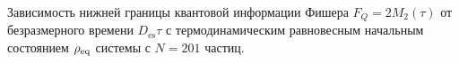  Зависимость нижней границы квантовой информации Фишера $F_Q = 2M_2(\tau)$ от безразмерного времени $D_\mathrm{es}\tau$ с термодинамическим равновесным начальным состоянием $\rho_\mathrm{eq}$ системы с $N=201$ частиц.
